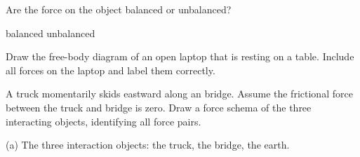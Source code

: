 \documentclass[answers]{exam}
\begin{document}
\begin{questions}
\question \label{3M4Xb}
Are the force on the object balanced or unbalanced?

\begin{randomizeoneparchoices}[norandomize]
    \correctchoice balanced
    \choice unbalanced
\end{randomizeoneparchoices}

\fi

\clearpage

\ifprintanswers
{
    \huge
    \printkeytable
}
\fi

\clearpage

\question[3]
Draw the free-body diagram of an open laptop that is resting on a table. Include all forces on the laptop and label them correctly. 


\begin{solutionorbox}[6cm]
\begin{center}
\end{center}
\end{solutionorbox}


\question[3]
A truck momentarily skids eastward along an bridge. Assume the frictional force between the truck and bridge is zero. Draw a force schema of the three interacting objects, identifying all force pairs. 

\begin{solutionorbox}[10cm]
(a) The three interaction objects: the truck, the bridge, the earth.


\end{solutionorbox}
\end{questions}
\end{document}
